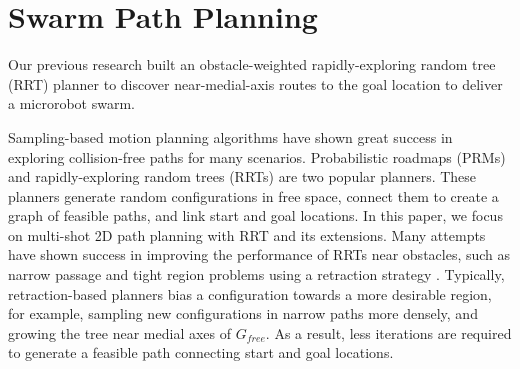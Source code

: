 \section{Swarm Path Planning}\label{sec:path}

Our previous research built an obstacle-weighted rapidly-exploring random tree (RRT) planner to discover near-medial-axis routes to the goal location to deliver a microrobot swarm.  

Sampling-based motion planning algorithms have shown great success in exploring collision-free paths for many scenarios. Probabilistic roadmaps (PRMs) \cite{kavraki1998probabilistic} and rapidly-exploring random trees (RRTs) \cite{lavalle1998rapidly} are two popular planners. These planners generate random configurations in free space, connect them to create a graph of feasible paths, and link start and goal locations. In this paper, we focus on multi-shot 2D path planning with RRT and its extensions. Many attempts have shown success in improving the performance of RRTs near obstacles, such as narrow passage and tight region problems using a retraction strategy \cite{zhang2008efficient} \cite{tang2006obstacle}.  Typically, retraction-based planners bias a configuration towards a more desirable region, for example, sampling new configurations in narrow paths more densely, and growing the tree near medial axes of $G_{free}$. %
As a result, less iterations are required to generate a feasible path connecting start and goal locations. 

